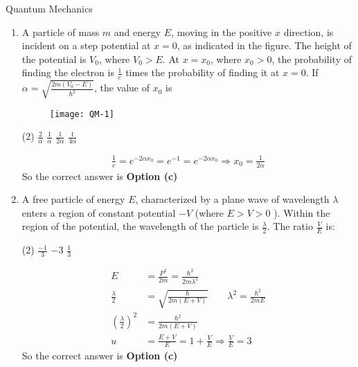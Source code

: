 \begin{abox}
	Quantum Mechanics
	\end{abox}
\begin{enumerate}
	\item A particle of mass $m$ and energy $E$, moving in the positive $x$ direction, is incident on a step potential at $x=0$, as indicated in the figure. The height of the potential is $V_{0}$, where $V_{0}>E$. At $x=x_{0}$, where $x_{0}>0$, the probability of finding the electron is $\frac{1}{e}$ times the probability of finding it at $x=0$.
	If $\alpha=\sqrt{\frac{2 m\left(V_{0}-E\right)}{\hbar^{2}}}$, the value of $x_{0}$ is
	\begin{figure}[H]
		\centering
		\texttt{[image: QM-1]}
	\end{figure}
	 \begin{tasks}(2)
		\task[\textbf{a.}]$\frac{2}{\alpha}$
		\task[\textbf{b.}]$\frac{1}{\alpha}$
		\task[\textbf{c.}]$\frac{1}{2 \alpha}$
		\task[\textbf{d.}] $\frac{1}{4 \alpha}$
	\end{tasks}
\begin{answer}
	$$
	\begin{aligned}
	\frac{1}{e}=e^{-2 \alpha x_{0}}=e^{-1}=e^{-2 \alpha x_{0}} \Rightarrow x_{0}=\frac{1}{2 \alpha}
\end{aligned}
$$
So the correct answer is \textbf{Option (c)}
\end{answer}
	\item A free particle of energy $E$, characterized by a plane wave of wavelength $\lambda$ enters a region of constant potential $-V$ (where $E>V>0$ ). Within the region of the potential, the wavelength of the particle is $\frac{\lambda}{2}$. The ratio $\frac{V}{E}$ is:
	 \begin{tasks}(2)
		\task[\textbf{a.}]$\frac{-1}{3}$
		\task[\textbf{b.}] $-3$
		\task[\textbf{d.}]  $\frac{1}{3}$
	\end{tasks}
\begin{answer}
	$$
	\begin{aligned}
	E&=\frac{P^{2}}{2 m}=\frac{\hbar^{2}}{2 m \lambda^{2}}\\
	\frac{\lambda}{2}&=\sqrt{\frac{\hbar}{2 m(E+V)}}\qquad \lambda^{2}=\frac{\hbar^{2}}{2 m E}\\
	\left(\frac{\lambda}{2}\right)^{2}&=\frac{\hbar^{2}}{2 m(E+V)}\\
	u&=\frac{E+V}{E}=1+\frac{V}{E} \Rightarrow \frac{V}{E}=3
\end{aligned}
$$
So the correct answer is \textbf{Option (c)}

\end{answer}
\end{enumerate}
